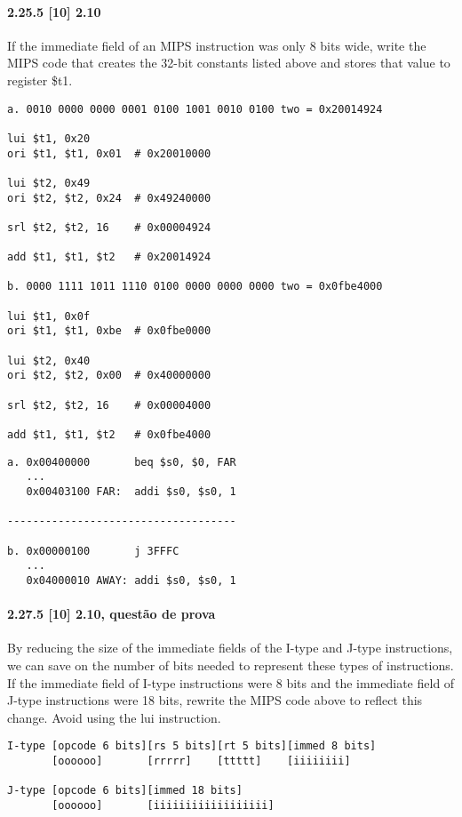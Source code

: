 \documentclass{article}
\begin{document}
\paragraph{2.25.5  [10] 2.10} If the immediate field of an MIPS instruction was
only 8 bits wide, write the MIPS code that creates the 32-bit constants listed
above and stores that value to register \$t1.

\begin{verbatim}
a. 0010 0000 0000 0001 0100 1001 0010 0100 two = 0x20014924

lui $t1, 0x20
ori $t1, $t1, 0x01  # 0x20010000

lui $t2, 0x49
ori $t2, $t2, 0x24  # 0x49240000

srl $t2, $t2, 16    # 0x00004924

add $t1, $t1, $t2   # 0x20014924

b. 0000 1111 1011 1110 0100 0000 0000 0000 two = 0x0fbe4000

lui $t1, 0x0f
ori $t1, $t1, 0xbe  # 0x0fbe0000

lui $t2, 0x40
ori $t2, $t2, 0x00  # 0x40000000

srl $t2, $t2, 16    # 0x00004000

add $t1, $t1, $t2   # 0x0fbe4000
\end{verbatim}


\pagebreak

\begin{verbatim}
a. 0x00400000       beq $s0, $0, FAR
   ...
   0x00403100 FAR:  addi $s0, $s0, 1

------------------------------------

b. 0x00000100       j 3FFFC
   ...
   0x04000010 AWAY: addi $s0, $s0, 1
\end{verbatim}

\paragraph{2.27.5 [10] 2.10, questão de prova} By reducing the size of the
immediate fields of the I-type and J-type instructions, we can save on the
number of bits needed to represent these types of instructions. If the immediate
field of I-type instructions were 8 bits and the immediate field of J-type
instructions were 18 bits, rewrite the MIPS code above to reflect this change.
Avoid using the lui instruction.

\begin{verbatim}
I-type [opcode 6 bits][rs 5 bits][rt 5 bits][immed 8 bits]
       [oooooo]       [rrrrr]    [ttttt]    [iiiiiiii]

J-type [opcode 6 bits][immed 18 bits]
       [oooooo]       [iiiiiiiiiiiiiiiiii]
\end{verbatim}
\end{document}
